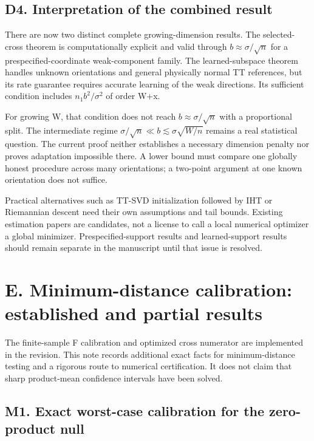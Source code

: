 \documentclass[
  11pt,
]{article}
\begin{document}
\subsection{D4. Interpretation of the combined
result}\label{d4.-interpretation-of-the-combined-result}

There are now two distinct complete growing-dimension results. The
selected-cross theorem is computationally explicit and valid through
\(b≈\sigma /\sqrt{n}\) for a prespecified-coordinate weak-component
family. The learned-subspace theorem handles unknown orientations and
general physically normal TT references, but its rate guarantee requires
accurate learning of the weak directions. Its sufficient condition
includes \(n_1b^{2}/\sigma ^{2}\) of order W+x.

For growing W, that condition does not reach \(b≈\sigma /\sqrt{n}\) with
a proportional split. The intermediate regime
\(\sigma /\sqrt{n}\ll b\lesssim \sigma \sqrt {W/n}\) remains a real
statistical question. The current proof neither establishes a necessary
dimension penalty nor proves adaptation impossible there. A lower bound
must compare one globally honest procedure across many orientations; a
two-point argument at one known orientation does not suffice.

Practical alternatives such as TT-SVD initialization followed by IHT or
Riemannian descent need their own assumptions and tail bounds. Existing
estimation papers are candidates, not a license to call a local
numerical optimizer a global minimizer. Prespecified-support results and
learned-support results should remain separate in the manuscript until
that issue is resolved.

\newpage

\section{E. Minimum-distance calibration: established and partial
results}\label{e.-minimum-distance-calibration-established-and-partial-results}

The finite-sample F calibration and optimized cross numerator are
implemented in the revision. This note records additional exact facts
for minimum-distance testing and a rigorous route to numerical
certification. It does not claim that sharp product-mean confidence
intervals have been solved.

\subsection{M1. Exact worst-case calibration for the zero-product
null}\label{m1.-exact-worst-case-calibration-for-the-zero-product-null}
\end{document}
